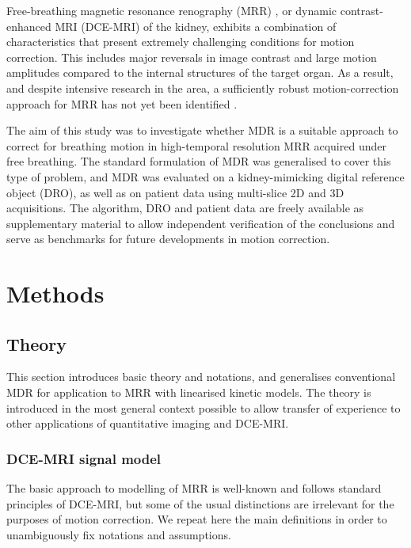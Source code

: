 \documentclass[num-refs]{wiley-article}
\begin{document}
Free-breathing magnetic resonance renography (MRR) \cite{Basak2019}, or dynamic contrast-enhanced MRI (DCE-MRI) of the kidney, exhibits a combination of characteristics that present extremely challenging conditions for motion correction. This includes major reversals in image contrast and large motion amplitudes compared to the internal structures of the target organ. As a result, and despite intensive research in the area, a sufficiently robust motion-correction approach for MRR has not yet been identified \cite{Zollner2020}. 

The aim of this study was to investigate whether MDR is a suitable approach to correct for breathing motion in high-temporal resolution MRR acquired under free breathing. The standard formulation of MDR was generalised to cover this type of problem, and MDR was evaluated on a kidney-mimicking digital reference object (DRO), as well as on patient data using multi-slice 2D and 3D acquisitions. The algorithm, DRO and patient data are freely available as supplementary material to allow independent verification of the conclusions and serve as benchmarks for future developments in motion correction.

\section{Methods}

\subsection{Theory}

This section introduces basic theory and notations, and generalises conventional MDR for application to MRR with linearised kinetic models. The theory is introduced in the most general context possible to allow transfer of experience to other applications of quantitative imaging and DCE-MRI.

\subsubsection{DCE-MRI signal model}

The basic approach to modelling of MRR is well-known \cite{Basak2019} and follows standard principles of DCE-MRI, but some of the usual distinctions are irrelevant for the purposes of motion correction. We repeat here the main definitions in order to unambiguously fix notations and assumptions. 
\end{document}
